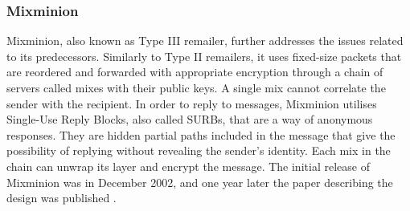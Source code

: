 \subsubsection{Mixminion}
Mixminion, also known as Type III remailer, further addresses the issues related to its predecessors. Similarly to Type II remailers, it uses fixed-size packets that are reordered and forwarded with appropriate encryption through a chain of servers called mixes with their public keys. A single mix cannot correlate the sender with the recipient. 
In order to reply to messages, Mixminion utilises Single-Use Reply Blocks, also called SURBs, that are a way of anonymous responses. They are hidden partial paths included in the message that give the possibility of replying without revealing the sender’s identity. Each mix in the chain can unwrap its layer and encrypt the message.
The initial release of Mixminion was in December 2002, and one year later the paper describing the design was published \cite{mixminion}.

